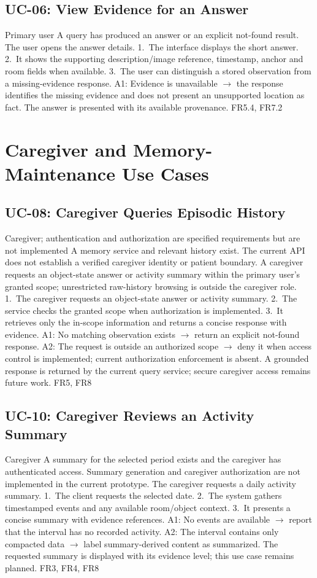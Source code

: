 \subsection{UC-06: View Evidence for an Answer}
{Primary user}
{A query has produced an answer or an explicit not-found result.}
{The user opens the answer details.}
{1.~The interface displays the short answer. 2.~It shows the supporting description/image reference, timestamp, anchor and room fields when available. 3.~The user can distinguish a stored observation from a missing-evidence response.}
{A1: Evidence is unavailable $\rightarrow$ the response identifies the missing evidence and does not present an unsupported location as fact.}
{The answer is presented with its available provenance.}
{FR5.4, FR7.2}

\section{Caregiver and Memory-Maintenance Use Cases}
\subsection{UC-08: Caregiver Queries Episodic History}
{Caregiver; authentication and authorization are specified requirements but are not implemented}
{A memory service and relevant history exist. The current API does not establish a verified caregiver identity or patient boundary.}
{A caregiver requests an object-state answer or activity summary within the primary user's granted scope; unrestricted raw-history browsing is outside the caregiver role.}
{1.~The caregiver requests an object-state answer or activity summary. 2.~The service checks the granted scope when authorization is implemented. 3.~It retrieves only the in-scope information and returns a concise response with evidence.}
{A1: No matching observation exists $\rightarrow$ return an explicit not-found response. A2: The request is outside an authorized scope $\rightarrow$ deny it when access control is implemented; current authorization enforcement is absent.}
{A grounded response is returned by the current query service; secure caregiver access remains future work.}
{FR5, FR8}

\subsection{UC-10: Caregiver Reviews an Activity Summary}
{Caregiver}
{A summary for the selected period exists and the caregiver has authenticated access. Summary generation and caregiver authorization are not implemented in the current prototype.}
{The caregiver requests a daily activity summary.}
{1.~The client requests the selected date. 2.~The system gathers timestamped events and any available room/object context. 3.~It presents a concise summary with evidence references.}
{A1: No events are available $\rightarrow$ report that the interval has no recorded activity. A2: The interval contains only compacted data $\rightarrow$ label summary-derived content as summarized.}
{The requested summary is displayed with its evidence level; this use case remains planned.}
{FR3, FR4, FR8}


